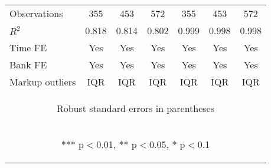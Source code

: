 \documentclass[]{article}
\begin{document}
\begin{center}
\begin{tabular}{lcccccc}
Observations & 355 & 453 & 572 & 355 & 453 & 572 \\
$R^2$ & 0.818 & 0.814 & 0.802 & 0.999 & 0.998 & 0.998 \\
Time FE & Yes & Yes & Yes & Yes & Yes & Yes \\
Bank FE & Yes & Yes & Yes & Yes & Yes & Yes \\
 Markup outliers & IQR & IQR & IQR & IQR & IQR & IQR \\ \hline
\multicolumn{7}{c}{\begin{footnotesize} Robust standard errors in parentheses\end{footnotesize}} \\
\multicolumn{7}{c}{\begin{footnotesize} *** p$<$0.01, ** p$<$0.05, * p$<$0.1\end{footnotesize}} \\
\end{tabular}
\end{center}
\end{document}
